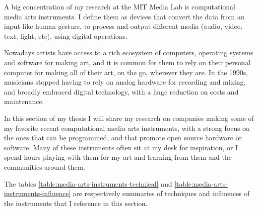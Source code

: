 A big concentration of my research at the MIT Media Lab is computational media arts instruments. I define them as devices that convert the data from an input like human gesture, to process and output different media (audio, video, text, light, etc), using digital operations.

Nowadays artists have access to a rich ecosystem of computers, operating systems and software for making art, and it is common for them to rely on their personal computer for making all of their art, on the go, wherever they are. In the 1990s, musicians stopped having to rely on analog hardware for recording and mixing, and broadly embraced digital technology, with a huge reduction on costs and maintenance.

In this section of my thesis I will share my research on companies making some of my favorite recent computational media arts instruments, with a strong focus on the ones that can be programmed, and that promote open source hardware or software. Many of these instruments often sit at my desk for inspiration, or I spend hours playing with them for my art and learning from them and the communities around them.

The tables \ref{table:media-arts-instruments-technical} and \ref{table:media-arts-instruments-influence} are respectively summaries of techniques and influences of the instruments that I reference in this section.

